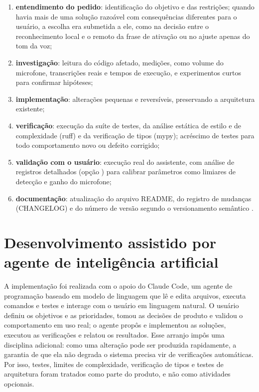 \begin{enumerate}[label=\alph*)]
  \item \textbf{entendimento do pedido}: identificação do objetivo e das restrições; quando havia mais
        de uma solução razoável com consequências diferentes para o usuário, a escolha era submetida a
        ele, como na decisão entre o reconhecimento local e o remoto da frase de ativação ou no
        ajuste apenas do tom da voz;
  \item \textbf{investigação}: leitura do código afetado, medições, como volume do microfone,
        transcrições reais e tempos de execução, e experimentos curtos para confirmar hipóteses;
  \item \textbf{implementação}: alterações pequenas e reversíveis, preservando a arquitetura existente;
  \item \textbf{verificação}: execução da suíte de testes, da análise estática de estilo e de
        complexidade (ruff) e da verificação de tipos (mypy); acréscimo de testes para todo
        comportamento novo ou defeito corrigido;
  \item \textbf{validação com o usuário}: execução real do assistente, com análise de registros
        detalhados (opção ) para calibrar parâmetros como limiares de detecção e ganho do
        microfone;
  \item \textbf{documentação}: atualização do arquivo README, do registro de mudanças (CHANGELOG) e do
        número de versão segundo o versionamento semântico \cite{semver}.
\end{enumerate}

\section{Desenvolvimento assistido por agente de inteligência artificial}

A implementação foi realizada com o apoio do Claude Code, um agente de programação baseado em modelo de
linguagem que lê e edita arquivos, executa comandos e testes e interage com o usuário em linguagem
natural. O usuário definiu os objetivos e as prioridades, tomou as decisões de produto e validou o
comportamento em uso real; o agente propôs e implementou as soluções, executou as verificações e
relatou os resultados. Esse arranjo impôs uma disciplina adicional: como uma alteração pode ser
produzida rapidamente, a garantia de que ela não degrada o sistema precisa vir de verificações
automáticas. Por isso, testes, limites de complexidade, verificação de tipos e testes de arquitetura
foram tratados como parte do produto, e não como atividades opcionais.

